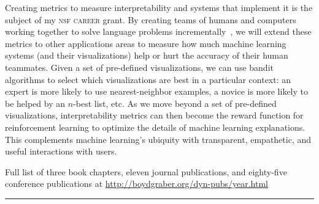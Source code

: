 Creating metrics to measure interpretability and systems that implement it is
the subject of my \textsc{nsf career} grant. By creating teams of humans and
computers working together to solve language problems
incrementally~\cite{feng-19}, we will extend these metrics to other
applications areas to measure how much machine learning systems (and their
visualizations) help or hurt the accuracy of their human teammates. Given a set
of pre-defined visualizations, we can use bandit algorithms to select which
visualizations are best in a particular context: an expert is more likely to
use nearest-neighbor examples, a novice is more likely to be helped by an
$n$-best list, etc. As we move beyond a set of pre-defined visualizations,
interpretability metrics can then become the reward function for reinforcement
learning to optimize the details of machine learning explanations. This
complements machine learning's ubiquity with transparent, empathetic, and
useful interactions with users.





\clearpage




\begin{center}
Full list of  three book chapters, eleven journal publications, and eighty-five conference
publications at \url{http://boydgraber.org/dyn-pubs/year.html}
\end{center}

%

\noindent\rule{4cm}{0.4pt}

